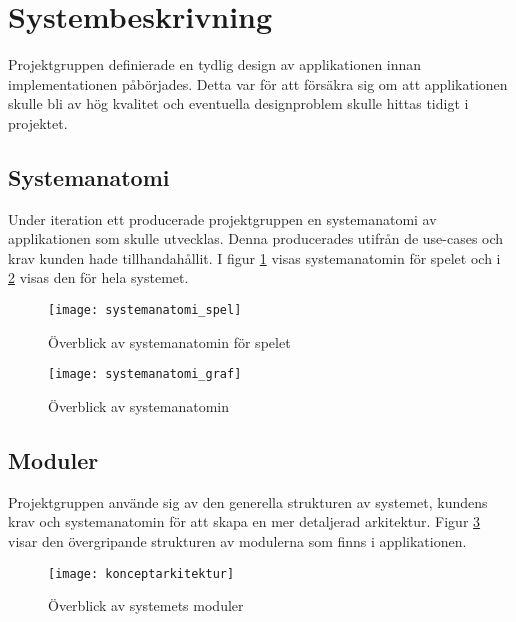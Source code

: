 \section{Systembeskrivning}

Projektgruppen definierade en tydlig design av applikationen innan implementationen påbörjades. Detta var för att försäkra sig om att applikationen skulle bli av hög kvalitet och eventuella designproblem skulle hittas tidigt i projektet.

\subsection{Systemanatomi}
\label{beskrivning-systemanatomi}
Under iteration ett producerade projektgruppen en systemanatomi av applikationen som skulle utvecklas. Denna producerades utifrån de use-cases och krav kunden hade tillhandahållit. I figur \ref{fig:systemanatomi_spel} visas systemanatomin för spelet och i \ref{fig:systemanatomi_graf} visas den för hela systemet.

\begin{figure}[H]
    \centering
    \texttt{[image: systemanatomi\_spel]}
    \caption{Överblick av systemanatomin för spelet}
    \label{fig:systemanatomi_spel}
\end{figure}


\begin{figure}[H]
    \centering
    \texttt{[image: systemanatomi\_graf]}
    \caption{Överblick av systemanatomin}
    \label{fig:systemanatomi_graf}
\end{figure}

\pagebreak

\subsection{Moduler}
\label{moduler}
Projektgruppen använde sig av den generella strukturen av systemet, kundens krav och systemanatomin för att skapa en mer detaljerad arkitektur. Figur \ref{fig:konceptarkitektur} visar den övergripande strukturen av modulerna som finns i applikationen.

\begin{figure}[h]
    \centering
    \texttt{[image: konceptarkitektur]}
    \caption{Överblick av systemets moduler}
    \label{fig:konceptarkitektur}
\end{figure}

\pagebreak

